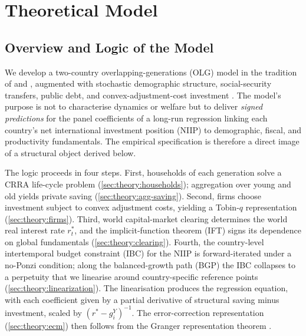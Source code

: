 
\section{Theoretical Model}\label{sec:theory}

\subsection{Overview and Logic of the Model}\label{sec:theory:overview}

We develop a two-country overlapping-generations (OLG) model in the tradition of
\citet{Samuelson1958} and \citet{Diamond1965}, augmented with stochastic
demographic structure, social-security transfers, public debt, and
convex-adjustment-cost investment \citep{Hayashi1982}. The model's purpose is
not to characterise dynamics or welfare but to deliver \emph{signed
predictions} for the panel coefficients of a long-run regression linking
each country's net international investment position (NIIP) to demographic,
fiscal, and productivity fundamentals. The empirical specification is therefore
a direct image of a structural object derived below.

The logic proceeds in four steps. First, households of each generation solve a
CRRA life-cycle problem (\cref{sec:theory:households}); aggregation over young
and old yields private saving (\cref{sec:theory:agg-saving}). Second, firms
choose investment subject to convex adjustment costs, yielding a Tobin-$q$
representation (\cref{sec:theory:firms}). Third, world capital-market clearing
determines the world real interest rate $r_t^*$, and the implicit-function
theorem (IFT) signs its dependence on global fundamentals
(\cref{sec:theory:clearing}). Fourth, the country-level intertemporal budget
constraint (IBC) for the NIIP is forward-iterated under a no-Ponzi condition;
along the balanced-growth path (BGP) the IBC collapses to a perpetuity that we
linearise around country-specific reference points
(\cref{sec:theory:linearization}). The linearisation produces the regression
equation, with each coefficient given by a partial derivative of structural
saving minus investment, scaled by $(r^*-g_i^Y)^{-1}$. The error-correction
representation (\cref{sec:theory:ecm}) then follows from the Granger
representation theorem \citep{EngleGranger1987}.

